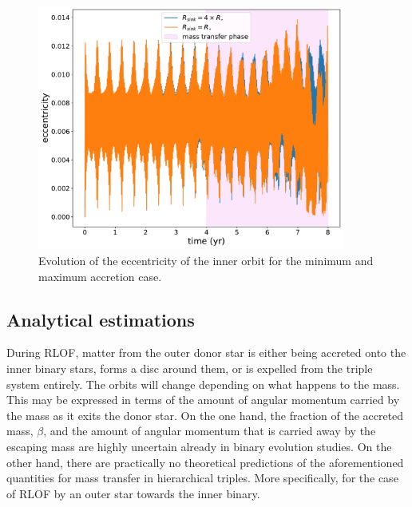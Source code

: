 \begin{figure}[H]
    \centering
    \includegraphics[width=0.9\textwidth]{Thesis/graphs/accretion_case/accretion_inner_ecc.pdf}
    \caption{Evolution of the eccentricity of the inner orbit for the minimum and maximum accretion case.}
    \label{fig:accretion_inner_ecc}
\end{figure}

\subsection{Analytical estimations}

During RLOF, matter from the outer donor star is either being accreted onto the inner binary stars, forms a disc around them, or is expelled from the triple system entirely. The orbits will change depending on what happens to the mass. This may be expressed in terms of the amount of angular momentum carried by the mass as it exits the donor star. On the one hand, the fraction of the accreted mass, $\beta$, and the amount of angular momentum that is carried away by the escaping mass are highly uncertain already in binary evolution studies. On the other hand, there are practically no theoretical predictions of the aforementioned quantities for mass transfer in hierarchical triples. More specifically, for the case of RLOF by an outer star towards the inner binary. 

